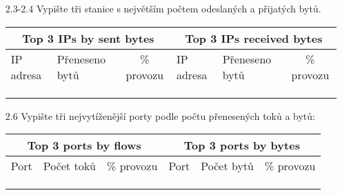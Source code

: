 \documentclass[a4paper,11pt]{article}
\begin{document}
\begin{itemize} 
\item[2.3-2.4] Vypište tři stanice s největším počtem odeslaných a přijatých bytů.  

\begin{tabular}{|p{2cm}|p{3cm}|c||p{2cm}|p{3cm}|c|}
  \hline
  \multicolumn{3}{|c||}{Top 3 IPs by sent bytes} & \multicolumn{3}{|c|}{Top 3 IPs received bytes} \\\hline
IP adresa  & Přeneseno bytů  & \% provozu & IP adresa  & Přeneseno bytů  & \% provozu \\ \hline
      &                 &           &&&   \\   \hline
      &                 &           &&&   \\  \hline
      &                 &           &&&   \\   \hline
\end{tabular}

\item[2.6] Vypište tři nejvytíženější porty podle počtu přenesených toků a bytů: 

\begin{tabular}{|p{2cm}|p{3cm}|c||p{2cm}|p{3cm}|c|}
\hline
  \multicolumn{3}{|c||}{Top 3 ports by flows} & \multicolumn{3}{|c|}{Top 3 ports by bytes} \\\hline
Port  & Počet toků  & \% provozu & Port & Počet bytů & \% provozu \\ \hline
      &                  &       &&& \\  \hline
      &                  &       &&& \\  \hline
      &                  &       &&& \\  \hline
\end{tabular}
\end{itemize}
\end{document}

